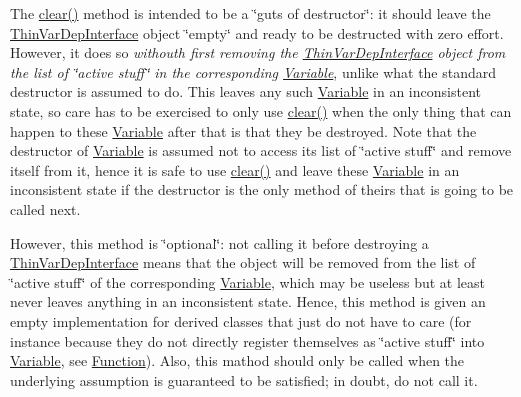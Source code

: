 The \mbox{\hyperlink{class_s_m_spp__di__unipi__it_1_1_linear_function_a9862fdd31593937c218bbda548c85fcc}{clear()}} method is intended to be a \char`\"{}guts of destructor\char`\"{}\+: it should leave the \mbox{\hyperlink{class_s_m_spp__di__unipi__it_1_1_thin_var_dep_interface}{Thin\+Var\+Dep\+Interface}} object \char`\"{}empty\char`\"{} and ready to be destructed with zero effort. However, it does so {\itshape withouth first removing the \mbox{\hyperlink{class_s_m_spp__di__unipi__it_1_1_thin_var_dep_interface}{Thin\+Var\+Dep\+Interface}} object from the list of \char`\"{}active stuff\char`\"{} in the corresponding \mbox{\hyperlink{class_s_m_spp__di__unipi__it_1_1_variable}{Variable}}}, unlike what the standard destructor is assumed to do. This leaves any such \mbox{\hyperlink{class_s_m_spp__di__unipi__it_1_1_variable}{Variable}} in an inconsistent state, so care has to be exercised to only use \mbox{\hyperlink{class_s_m_spp__di__unipi__it_1_1_linear_function_a9862fdd31593937c218bbda548c85fcc}{clear()}} when the only thing that can happen to these \mbox{\hyperlink{class_s_m_spp__di__unipi__it_1_1_variable}{Variable}} after that is that they be destroyed. Note that the destructor of \mbox{\hyperlink{class_s_m_spp__di__unipi__it_1_1_variable}{Variable}} is assumed not to access its list of \char`\"{}active
stuff\char`\"{} and remove itself from it, hence it is safe to use \mbox{\hyperlink{class_s_m_spp__di__unipi__it_1_1_linear_function_a9862fdd31593937c218bbda548c85fcc}{clear()}} and leave these \mbox{\hyperlink{class_s_m_spp__di__unipi__it_1_1_variable}{Variable}} in an inconsistent state if the destructor is the only method of theirs that is going to be called next.

However, this method is \char`\"{}optional\char`\"{}\+: not calling it before destroying a \mbox{\hyperlink{class_s_m_spp__di__unipi__it_1_1_thin_var_dep_interface}{Thin\+Var\+Dep\+Interface}} means that the object will be removed from the list of \char`\"{}active stuff\char`\"{} of the corresponding \mbox{\hyperlink{class_s_m_spp__di__unipi__it_1_1_variable}{Variable}}, which may be useless but at least never leaves anything in an inconsistent state. Hence, this method is given an empty implementation for derived classes that just do not have to care (for instance because they do not directly register themselves as \char`\"{}active stuff\char`\"{} into \mbox{\hyperlink{class_s_m_spp__di__unipi__it_1_1_variable}{Variable}}, see \mbox{\hyperlink{class_s_m_spp__di__unipi__it_1_1_function}{Function}}). Also, this mathod should only be called when the underlying assumption is guaranteed to be satisfied; in doubt, do not call it. 

